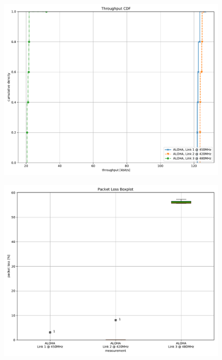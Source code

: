 \documentclass{article}
\begin{document}
\begin{figure}
	\includegraphics[width=\textwidth]{aloha_single/cdf/throughput_cdf}
\end{figure}

\begin{figure}
	\includegraphics[width=\textwidth]{aloha_single/boxplot/packet_loss_boxplot}
\end{figure}
\end{document}
